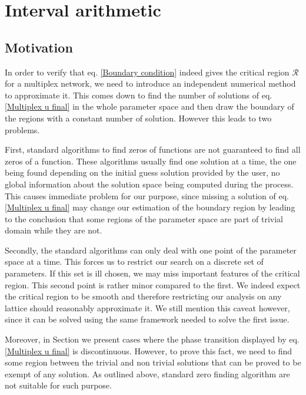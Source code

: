 \documentclass[
11pt, %
english, %
singlespacing, %
nolistspacing, %
liststotoc, %
headsepline, %
]{MastersDoctoralThesis} %
\begin{document}
\section{Interval arithmetic}
\label{Section: Interval arithemetic}

\subsection{Motivation}

In order to verify that eq. \eqref{Boundary condition} indeed gives the critical region $\mathcal{R}$ for a multiplex network, we need to introduce an independent numerical method to approximate it. This comes down to find the number of solutions of eq. \eqref{Multiplex u final} in the whole parameter space and then draw the boundary of the regions with a constant number of solution. However this leads to two problems.

First, standard algorithms to find zeros of functions are not guaranteed to find all zeros of a function. These algorithms usually find one solution at a time, the one being found depending on the initial guess solution provided by the user, no global information about the solution space being computed during the process. This causes immediate problem for our purpose, since missing a solution of eq. \eqref{Multiplex u final} may change our estimation of the boundary region by leading to the conclusion that some regions of the parameter space are part of trivial domain while they are not.

Secondly, the standard algorithms can only deal with one point of the parameter space at a time. This forces us to restrict our search on a discrete set of parameters. If this set is ill chosen, we may miss important features of the critical region. This second point is rather minor compared to the first. We indeed expect the critical region to be smooth and therefore restricting our analysis on any lattice should reasonably approximate it. We still mention this caveat however, since it can be solved using the same framework needed to solve the first issue.

Moreover, in Section \missingref{} we present cases where the phase transition displayed by eq. \eqref{Multiplex u final} is discontinuous. However, to prove this fact, we need to find some region between the trivial and non trivial solutions that can be proved to be exempt of any solution. As outlined above, standard zero finding algorithm are not suitable for such purpose.
\end{document}
